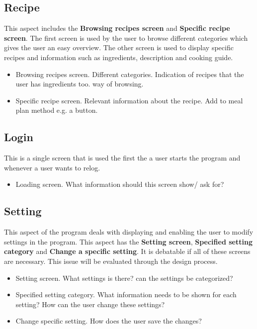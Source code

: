 \subsection{Recipe}
This aspect includes the \textbf{Browsing recipes screen} and \textbf{Specific recipe screen}. The first screen is used by the user to browse different categories which gives the user an easy overview. The other screen is used to display specific recipes and information such as ingredients, description and cooking guide.

\begin{itemize}
	\item Browsing recipes screen.
		\subitem Different categories. 
		\subitem Indication of recipes that the user has ingredients too.
		\subitem way of browsing.
	\item Specific recipe screen.
		\subitem Relevant information about the recipe.
		\subitem Add to meal plan method e.g. a button.
\end{itemize}

\subsection{Login}
This is a single screen that is used the first the a user starts the program and whenever a user wants to relog.

\begin{itemize}
	\item Loading screen.
		\subitem What information should this screen show/ ask for?
\end{itemize}

\subsection{Setting}
This aspect of the program deals with displaying and enabling the user to modify settings in the program. This aspect has the \textbf{Setting screen}, \textbf{Specified setting category} and \textbf{Change a specific setting}. It is debatable if all of these screens are necessary. This issue will be evaluated through the design process.

\begin{itemize}
	\item Setting screen. 
		\subitem What settings is there?
		\subitem can the settings be categorized?
	\item Specified setting category.
		\subitem What information needs to be shown for each setting?
		\subitem How can the user change these settings?
	\item Change specific setting.
		\subitem How does the user save the changes?
\end{itemize}  

